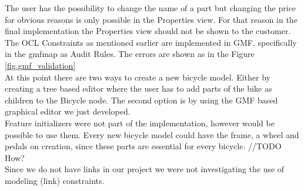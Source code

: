 \noindent The user has the possibility to change the name of a part but changing
the price for obvious reasons is only possible in the Properties view. For that
reason in the final implementation the Properties view should not be shown to
the customer. The OCL Constraints as mentioned earlier are implemented in GMF,
specifically in the gmfmap as Audit Rules.
The errors are shown as in the Figure \ref{fig.gmf_validation}\\

\noindent At this point there are two ways to create a new bicycle model. Either
by creating a tree based editor where the user has to add parts of the bike as
children to the Bicycle node. The second option is by using the GMF based
graphical editor we just developed. \\

\noindent Feature initializers were not part of the implementation, however
would be possible to use them. Every new bicycle model could have the frame, a
wheel and pedals on creation, since these parts are essential for every
bicycle. //TODO How?\\

\noindent Since we do not have links in our project we were not investigating
the use of modeling (link) constraints.\\

